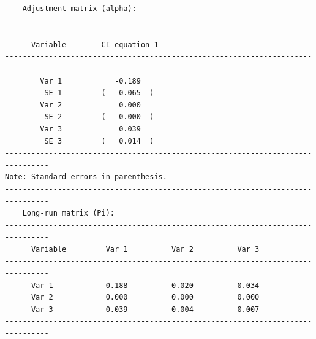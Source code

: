 \documentclass[article]{jss}
\begin{document}
\begin{verbatim}
    Adjustment matrix (alpha):                                                                         
--------------------------------------------------------------------------------
      Variable        CI equation 1  
--------------------------------------------------------------------------------
        Var 1            -0.189     
         SE 1         (   0.065  )  
        Var 2             0.000     
         SE 2         (   0.000  )  
        Var 3             0.039     
         SE 3         (   0.014  )  
--------------------------------------------------------------------------------
Note: Standard errors in parenthesis.                                                                
--------------------------------------------------------------------------------
    Long-run matrix (Pi):                                                                       
--------------------------------------------------------------------------------
      Variable         Var 1          Var 2          Var 3   
--------------------------------------------------------------------------------
      Var 1           -0.188         -0.020          0.034    
      Var 2            0.000          0.000          0.000    
      Var 3            0.039          0.004         -0.007    
--------------------------------------------------------------------------------


\end{verbatim}
\end{document}
